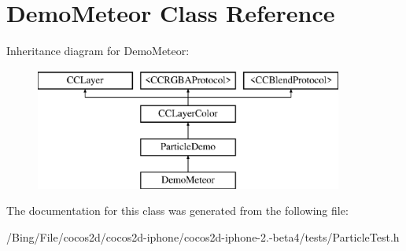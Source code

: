 \hypertarget{interface_demo_meteor}{\section{Demo\-Meteor Class Reference}
\label{interface_demo_meteor}
}
Inheritance diagram for Demo\-Meteor\-:\begin{figure}[H]
\begin{center}
\leavevmode
\includegraphics[height=4.000000cm]{interface_demo_meteor}
\end{center}
\end{figure}


The documentation for this class was generated from the following file\-:\begin{DoxyCompactItemize}
\item 
/\-Bing/\-File/cocos2d/cocos2d-\/iphone/cocos2d-\/iphone-\/2.-\/beta4/tests/Particle\-Test.\-h\end{DoxyCompactItemize}
